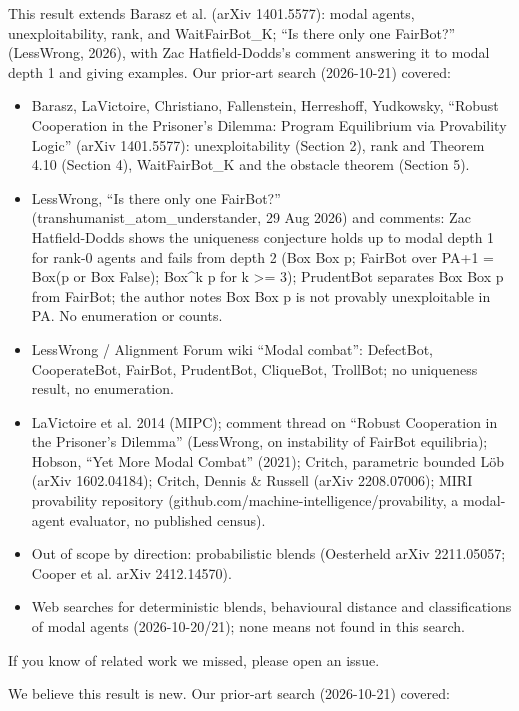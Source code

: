 \documentclass{article}
\begin{document}
This result extends Barasz et al. (arXiv 1401.5577): modal agents, unexploitability, rank, and WaitFairBot\_K; ``Is there only one FairBot?'' (LessWrong, 2026), with Zac Hatfield-Dodds's comment answering it to modal depth 1 and giving examples. Our prior-art search (2026-10-21) covered:

\begin{itemize}
\item Barasz, LaVictoire, Christiano, Fallenstein, Herreshoff, Yudkowsky, ``Robust Cooperation in the Prisoner's Dilemma: Program Equilibrium via Provability Logic'' (arXiv 1401.5577): unexploitability (Section 2), rank and Theorem 4.10 (Section 4), WaitFairBot\_K and the obstacle theorem (Section 5).
\item LessWrong, ``Is there only one FairBot?'' (transhumanist\_atom\_understander, 29 Aug 2026) and comments: Zac Hatfield-Dodds shows the uniqueness conjecture holds up to modal depth 1 for rank-0 agents and fails from depth 2 (Box Box p; FairBot over PA+1 = Box(p or Box False); Box\textasciicircum{}k p for k \textgreater{}= 3); PrudentBot separates Box Box p from FairBot; the author notes Box Box p is not provably unexploitable in PA. No enumeration or counts.
\item LessWrong / Alignment Forum wiki ``Modal combat'': DefectBot, CooperateBot, FairBot, PrudentBot, CliqueBot, TrollBot; no uniqueness result, no enumeration.
\item LaVictoire et al. 2014 (MIPC); comment thread on ``Robust Cooperation in the Prisoner's Dilemma'' (LessWrong, on instability of FairBot equilibria); Hobson, ``Yet More Modal Combat'' (2021); Critch, parametric bounded Löb (arXiv 1602.04184); Critch, Dennis \& Russell (arXiv 2208.07006); MIRI provability repository (github.com/machine-intelligence/provability, a modal-agent evaluator, no published census).
\item Out of scope by direction: probabilistic blends (Oesterheld arXiv 2211.05057; Cooper et al. arXiv 2412.14570).
\item Web searches for deterministic blends, behavioural distance and classifications of modal agents (2026-10-20/21); none means not found in this search.
\end{itemize}

If you know of related work we missed, please open an issue.

We believe this result is new. Our prior-art search (2026-10-21) covered:
\end{document}
